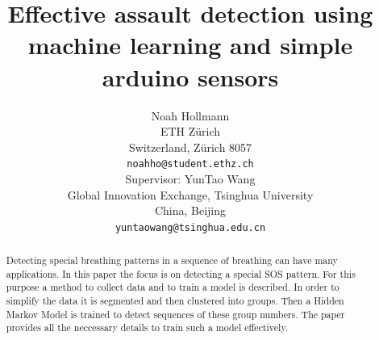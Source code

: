 \documentclass{article}
\title{Effective assault detection using machine learning and simple arduino sensors}
\author{
  Noah Hollmann \\
  ETH Zürich\\
  Switzerland, Zürich 8057 \\
  \texttt{noahho@student.ethz.ch} \\
  \And
  Supervisor: YunTao Wang \\
  Global Innovation Exchange, Tsinghua University \\
  China, Beijing \\
  \texttt{yuntaowang@tsinghua.edu.cn} \\
}
\begin{document}

\maketitle

\begin{abstract}
  Detecting special breathing patterns in a sequence of breathing can have many applications. In this paper the focus is on detecting a special SOS pattern. For this purpose a method to collect data and to train a model is described. In order to simplify the data it is segmented and then clustered into groups. Then a Hidden Markov Model is trained to detect sequences of these group numbers. The paper provides all the neccessary details to train such a model effectively.
\end{abstract}
\end{document}
